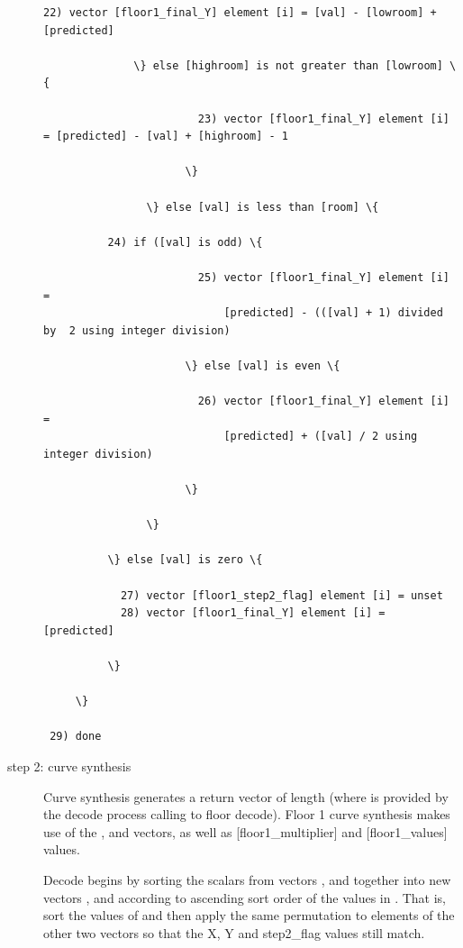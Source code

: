 \begin{description}
\begin{Verbatim}[commandchars=\\\{\}]
                        22) vector [floor1_final_Y] element [i] = [val] - [lowroom] + [predicted]

		      \} else [highroom] is not greater than [lowroom] \{

                        23) vector [floor1_final_Y] element [i] = [predicted] - [val] + [highroom] - 1

                      \}

                \} else [val] is less than [room] \{

		  24) if ([val] is odd) \{

                        25) vector [floor1_final_Y] element [i] =
                            [predicted] - (([val] + 1) divided by  2 using integer division)

                      \} else [val] is even \{

                        26) vector [floor1_final_Y] element [i] =
                            [predicted] + ([val] / 2 using integer division)

                      \}

                \}

          \} else [val] is zero \{

            27) vector [floor1_step2_flag] element [i] = unset
            28) vector [floor1_final_Y] element [i] = [predicted]

          \}

     \}

 29) done

\end{Verbatim}



\item[step 2: curve synthesis]

Curve synthesis generates a return vector \varname{[floor]} of length
\varname{[n]} (where \varname{[n]} is provided by the decode process
calling to floor decode).  Floor 1 curve synthesis makes use of the
,  and
 vectors, as well as [floor1_multiplier]
and [floor1_values] values.

Decode begins by sorting the scalars from vectors
,  and
 together into new vectors
,  and
 according to ascending sort order of the
values in .  That is, sort the values of
 and then apply the same permutation to
elements of the other two vectors so that the X, Y and step2_flag
values still match.


\end{description}
